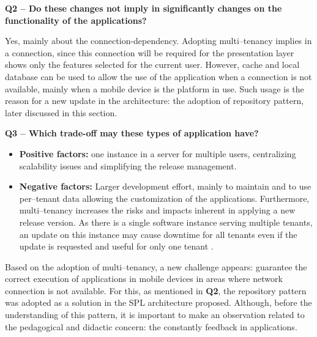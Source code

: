 \textbf{Q2 -- Do these changes not imply in significantly changes on the functionality of the applications?}

Yes, mainly about the connection-dependency. Adopting multi--tenancy implies in a connection, since this connection will be required for the presentation layer shows only the features selected for the current user. However, cache and local database can be used to allow the use of the application when a connection is not available, mainly when a mobile device is the platform in use. Such usage is the reason for a new update in the architecture: the adoption of repository pattern, later discussed in this section.

\textbf{Q3 -- Which trade-off may these types of application have?}

\begin{itemize}


\item \textbf{Positive factors:} one instance in a server for multiple users, centralizing scalability issues and simplifying the release management.

\item \textbf{Negative factors:} Larger development effort, mainly to maintain and to use per--tenant data allowing the customization of the applications. Furthermore, multi--tenancy increases the risks and impacts inherent in applying a new release version. As there is a single software instance serving multiple tenants, an update on this instance may cause downtime for all tenants even if the update is requested and useful for only one tenant \cite{krebs2012architectural}.

\end{itemize}


Based on the adoption of multi--tenancy, a new challenge appears: guarantee the correct execution of applications in mobile devices in areas where network connection is not available. For this, as mentioned in \textbf{Q2}, the repository pattern was adopted as a solution in the SPL architecture proposed. Although, before the understanding of this pattern, it is important to make an observation related to the pedagogical and didactic concern: the constantly feedback in applications.

